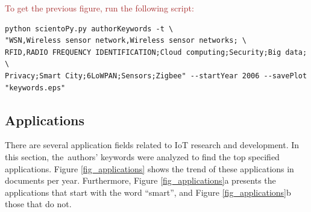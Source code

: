 \documentclass[symmetry,article,accept,moreauthors,pdftex10pt,a4paper]{mdpi}
\begin{document}
\noindent
\textcolor{brown}{To get the previous figure, run the following script:}\\
\begin{verbatim}
python scientoPy.py authorKeywords -t \
"WSN,Wireless sensor network,Wireless sensor networks; \
RFID,RADIO FREQUENCY IDENTIFICATION;Cloud computing;Security;Big data; \
Privacy;Smart City;6LoWPAN;Sensors;Zigbee" --startYear 2006 --savePlot "keywords.eps"
\end{verbatim}

  
\subsection{Applications}

There are several application fields related to IoT research and development. In this section, the~authors' keywords were analyzed to find the top specified applications. Figure \ref{fig_applications} shows the trend of these applications in documents per year. Furthermore, Figure \ref{fig_applications}a presents the applications that start with the word ``smart'', and Figure \ref{fig_applications}b those that do not.
\end{document}
